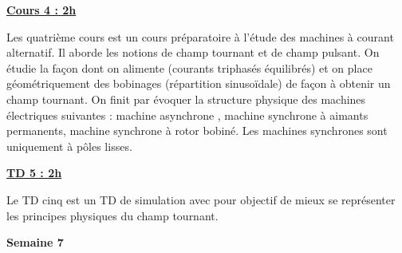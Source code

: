 \documentclass[12pt]{article}
\begin{document}
\begin{adjustwidth}{5em}{0pt}
\color{blue}
\hspace{20pt}\textbf{\underline{Cours 4 : 2h}}\par
\vspace{10pt}
\color{black}
Les quatrième cours est un cours préparatoire à l'étude des machines à courant alternatif. Il aborde les notions de champ tournant et de champ pulsant. On étudie la façon dont on alimente (courants triphasés équilibrés) et on place géométriquement des bobinages (répartition sinusoïdale) de façon à obtenir un champ tournant. On finit par évoquer la structure physique des machines électriques suivantes : machine asynchrone , machine synchrone à aimants permanents, machine synchrone à rotor bobiné. Les machines synchrones sont uniquement à pôles lisses.



\color{blue}
\hspace{20pt}\textbf{\underline{TD 5 : 2h}}\par
\vspace{10pt}
\color{black}
Le TD cinq est un TD de simulation avec pour objectif de mieux se représenter les principes physiques du champ tournant.

 

\end{adjustwidth}

\vspace{10pt}

\color{red}
\textbf{Semaine 7}
\end{document}
